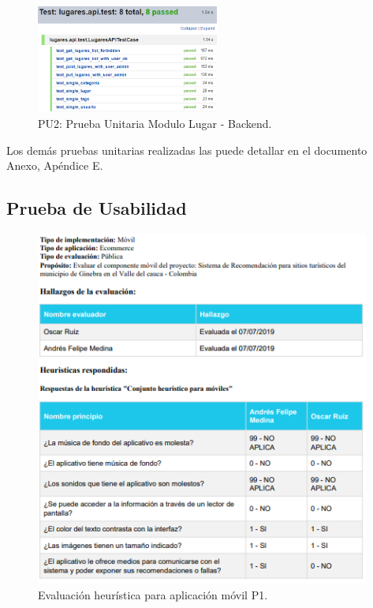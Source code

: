 \documentclass[12pt,letterpaper,openany]{book}
\begin{document}
\begin{figure}[H]
\begin{center}
\includegraphics[width=6cm]{./imagenes/Test/Backend/Test__lugares_api_test}
\caption{PU2: Prueba Unitaria Modulo Lugar - Backend.}
\end{center}
\end{figure}

Los demás pruebas unitarias realizadas las puede detallar en el documento Anexo, Apéndice E.

\subsection{Prueba de Usabilidad}
\begin{figure}[H]
\begin{center}
\includegraphics[width=11cm]{./imagenes/R1}
\caption{Evaluación heurística para aplicación móvil P1.}
\end{center}
\end{figure}
\end{document}
